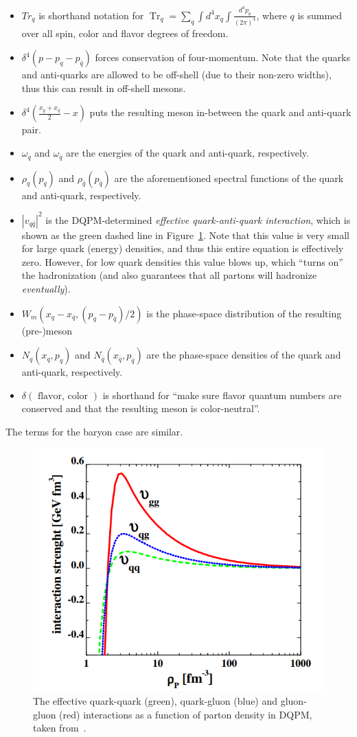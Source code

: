 \begin{itemize}
    \item $Tr_q$ is shorthand notation for $\operatorname{Tr}_q=\sum_q \int d^4 x_q \int \frac{d^4 p_q}{(2 \pi)^4}$, where $q$ is summed over all spin, color and flavor degrees of freedom.
    \item $\delta^4(p-p_q-p_{\bar{q}})$ forces conservation of four-momentum. Note that the quarks and anti-quarks are allowed to be off-shell (due to their non-zero widths), thus this can result in off-shell mesons.
    \item $\delta^4\left(\frac{x_q+x_{\bar{q}}}{2}-x\right)$ puts the resulting meson in-between the quark and anti-quark pair.
    \item $\omega_q$ and $\omega_{\bar{q}}$ are the energies of the quark and anti-quark, respectively.
    \item $\rho_q\left(p_q\right)$ and $\rho_{\bar{q}}\left(p_{\bar{q}}\right)$ are the aforementioned spectral functions of the quark and anti-quark, respectively.
    \item $\left|v_{q \bar{q}}\right|^2$ is the DQPM-determined \textit{effective quark-anti-quark interaction}, which is shown as the green dashed line in Figure~\ref{fig:vqq}. Note that this value is very small for large quark (energy) densities, and thus this entire equation is effectively zero. However, for low quark densities this value blows up, which ``turns on'' the hadronization (and also guarantees that all partons will hadronize \textit{eventually}).
    \item $W_m\left(x_q-x_{\bar{q}},\left(p_q-p_{\bar{q}}\right) / 2\right)$ is the phase-space distribution of the resulting (pre-)meson
    \item $N_q\left(x_q, p_q\right)$ and $N_{\bar{q}}\left(x_{\bar{q}}, p_{\bar{q}}\right)$ are the phase-space densities of the quark and anti-quark, respectively.
    \item $\delta(\text { flavor, color })$ is shorthand for ``make sure flavor quantum numbers are conserved and that the resulting meson is color-neutral''.
\end{itemize}
The terms for the baryon case are similar.

\begin{figure}[ht]
    \centering
    \includegraphics[width=0.5\linewidth]{figures/introduction/vqq.png}
    \caption{The effective quark-quark (green), quark-gluon (blue) and gluon-gluon (red) interactions as a function of parton density in DQPM, taken from~\cite{PHSD1}.}
    \label{fig:vqq}
\end{figure}

